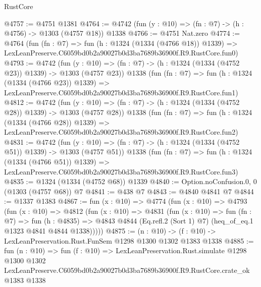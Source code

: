 \begin{lexlean}{RustCore}
\begin{coremodule}
@4757 := @4751 @1381
@4764 := @4742 (fun (y : @10) => (fn : @7) -> (h : @4756) -> @1303 (@4757 @18)) @1338
@4766 := @4751 Nat.zero
@4774 := @4764
    (fun (fn : @7) =>
    fun (h : @1324 (@1334 (@4766 @18)) @1339) =>
    LexLeanPreserve.C6059bd0b2a90027b0d3ba7689b36900f.R9.RustCore.fun0)
@4793 := @4742
    (fun (y : @10) => (fn : @7) -> (h : @1324 (@1334 (@4752 @23)) @1339) -> @1303 (@4757 @23))
    @1338
    (fun (fn : @7) =>
    fun (h : @1324 (@1334 (@4766 @23)) @1339) =>
    LexLeanPreserve.C6059bd0b2a90027b0d3ba7689b36900f.R9.RustCore.fun1)
@4812 := @4742
    (fun (y : @10) => (fn : @7) -> (h : @1324 (@1334 (@4752 @28)) @1339) -> @1303 (@4757 @28))
    @1338
    (fun (fn : @7) =>
    fun (h : @1324 (@1334 (@4766 @28)) @1339) =>
    LexLeanPreserve.C6059bd0b2a90027b0d3ba7689b36900f.R9.RustCore.fun2)
@4831 := @4742
    (fun (y : @10) => (fn : @7) -> (h : @1324 (@1334 (@4752 @51)) @1339) -> @1303 (@4757 @51))
    @1338
    (fun (fn : @7) =>
    fun (h : @1324 (@1334 (@4766 @51)) @1339) =>
    LexLeanPreserve.C6059bd0b2a90027b0d3ba7689b36900f.R9.RustCore.fun3)
@4835 := @1324 (@1334 (@4752 @68)) @1339
@4840 := Option.noConfusion.{0, 0} (@1303 (@4757 @68)) @7
@4841 := @438 @7
@4843 := @4840 @4841 @7
@4844 := @1337 @1383
@4867 := fun (x : @10) =>
  @4774
    (fun (x : @10) =>
    @4793
      (fun (x : @10) =>
      @4812
        (fun (x : @10) =>
        @4831
          (fun (x : @10) =>
          fun (fn : @7) =>
          fun (h : @4835) =>
          @4843 @4844 (Eq.refl.{2} (Sort 1) @7) (heq_of_eq.{1} @1323 @4841 @4844 @1338)))))
@4875 := (n : @10) -> (f : @10) -> LexLeanPreservation.Rust.FunSem @1298 @1300 @1302 @1383 @1338
@4885 := fun (n : @10) =>
  fun (f : @10) =>
  LexLeanPreservation.Rust.simulate
    @1298
    @1300
    @1302
    LexLeanPreserve.C6059bd0b2a90027b0d3ba7689b36900f.R9.RustCore.crate_ok
    @1383
    @1338
\end{coremodule}
\end{lexlean}

